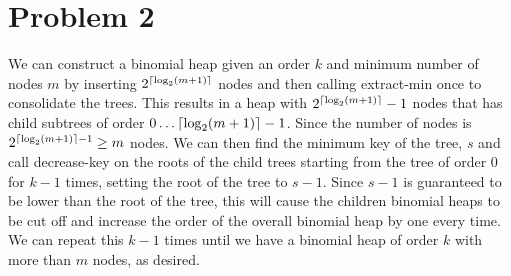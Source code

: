 \documentclass{article}
\DeclarePairedDelimiter{\ceil}{\lceil}{\rceil}
\theoremstyle{casestyle}
\begin{document}
\section *{Problem 2}

We can construct a binomial heap given an order $k$ and minimum number of nodes $m$ by inserting $2^{\ceil{\log_2 (m+1)}}$ nodes and then calling extract-min once to consolidate the trees. This results in a heap with $2^{\ceil{\log_2 (m+1)}}-1$ nodes that has child subtrees of order $0 \dots \ceil{\log_2 (m+1)}-1$. Since the number of nodes is $2^{\ceil{\log_2 (m+1)}-1} \geq m$ nodes. We can then find the minimum key of the tree, $s$ and call decrease-key on the roots of the child trees starting from the tree of order $0$ for $k-1$ times, setting the root of the tree to $s-1$. Since $s-1$ is guaranteed to be lower than the root of the tree, this will cause the children binomial heaps to be cut off and increase the order of the overall binomial heap by one every time. We can repeat this $k-1$ times until we have a binomial heap of order $k$ with more than $m$ nodes, as desired.






\end{document}
